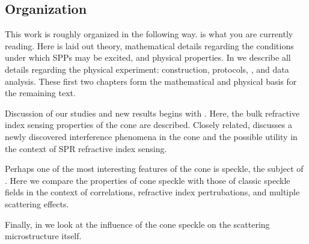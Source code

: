 \subsection{Organization}
This work is roughly organized in the following way.
 is what you are currently reading.  Here is laid out
theory, mathematical details regarding the conditions under which SPPs may
be excited, and physical properties.  In  we
describe all details regarding the physical experiment: construction,
protocols, , and data analysis.  These first two chapters form the
mathematical and physical basis for the remaining text.

Discussion of our studies and new results begins with .
Here, the bulk refractive index sensing properties of the cone are
described.  Closely related,  discusses a newly
discovered interference phenomena in the cone and the possible utility in
the context of SPR refractive index sensing.

Perhaps one of the most interesting features of the cone is speckle, the
subject of .  Here we compare the properties of cone
speckle with those of classic speckle fields in the context of
correlations, refractive index pertrubations, and multiple scattering
effects.

Finally, in  we look at the influence of the
cone speckle on the scattering microstructure itself.

